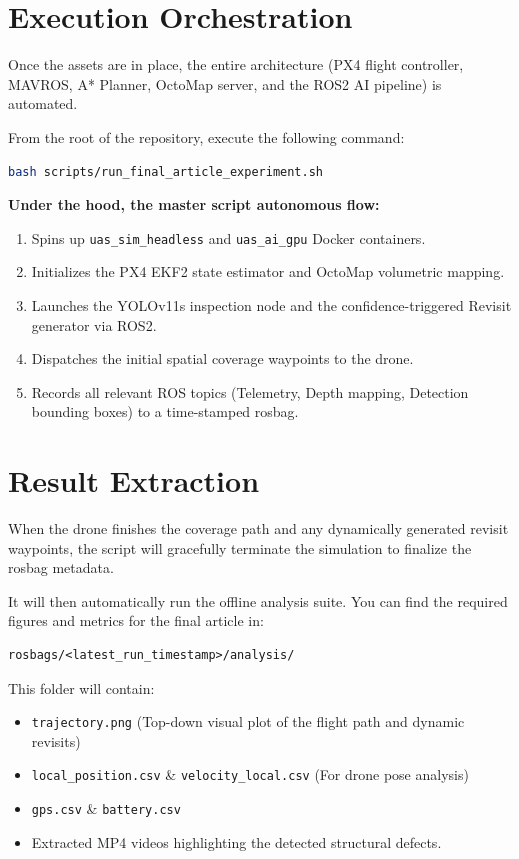 \documentclass[11pt,a4paper]{article}
\begin{document}
\section{Execution Orchestration}
Once the assets are in place, the entire architecture (PX4 flight controller, MAVROS, A* Planner, OctoMap server, and the ROS2 AI pipeline) is automated.

From the root of the repository, execute the following command:
\begin{lstlisting}[language=bash]
bash scripts/run_final_article_experiment.sh
\end{lstlisting}

\vspace{0.5cm}
\noindent \textbf{Under the hood, the master script autonomous flow:}
\begin{enumerate}
    \item Spins up \texttt{uas\_sim\_headless} and \texttt{uas\_ai\_gpu} Docker containers.
    \item Initializes the PX4 EKF2 state estimator and OctoMap volumetric mapping.
    \item Launches the YOLOv11s inspection node and the confidence-triggered Revisit generator via ROS2.
    \item Dispatches the initial spatial coverage waypoints to the drone.
    \item Records all relevant ROS topics (Telemetry, Depth mapping, Detection bounding boxes) to a time-stamped rosbag.
\end{enumerate}

\section{Result Extraction}
When the drone finishes the coverage path and any dynamically generated revisit waypoints, the script will gracefully terminate the simulation to finalize the rosbag metadata.

It will then automatically run the offline analysis suite. You can find the required figures and metrics for the final article in:
\begin{lstlisting}
rosbags/<latest_run_timestamp>/analysis/
\end{lstlisting}

This folder will contain:
\begin{itemize}
    \item \texttt{trajectory.png} (Top-down visual plot of the flight path and dynamic revisits)
    \item \texttt{local\_position.csv} \& \texttt{velocity\_local.csv} (For drone pose analysis)
    \item \texttt{gps.csv} \& \texttt{battery.csv}
    \item Extracted MP4 videos highlighting the detected structural defects.
\end{itemize}
\end{document}
